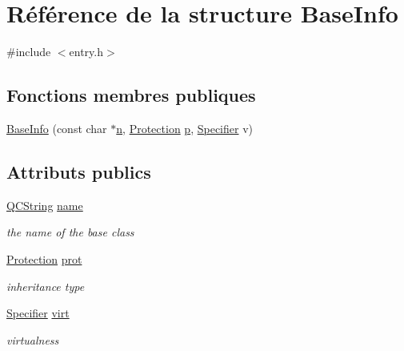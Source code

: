 \hypertarget{struct_base_info}{}\section{Référence de la structure Base\+Info}
\label{struct_base_info}


{\ttfamily \#include $<$entry.\+h$>$}

\subsection*{Fonctions membres publiques}
\begin{DoxyCompactItemize}
\item 
\hyperlink{struct_base_info_a98a84177d9d88a0520f7db57a13d2a4d}{Base\+Info} (const char $\ast$\hyperlink{060__command__switch_8tcl_acdde3cd86eb2421ce8dbb2e85227d368}{n}, \hyperlink{types_8h_a90e352184df58cd09455fe9996cd4ded}{Protection} \hyperlink{060__command__switch_8tcl_a15229b450f26d8fa1c10bea4f3279f4d}{p}, \hyperlink{types_8h_ab16236bdd10ddf4d73a9847350f0017e}{Specifier} v)
\end{DoxyCompactItemize}
\subsection*{Attributs publics}
\begin{DoxyCompactItemize}
\item 
\hyperlink{class_q_c_string}{Q\+C\+String} \hyperlink{struct_base_info_ae8bba327d477830b4664f9d03b05c97b}{name}
\begin{DoxyCompactList}\small\item\em the name of the base class \end{DoxyCompactList}\item 
\hyperlink{types_8h_a90e352184df58cd09455fe9996cd4ded}{Protection} \hyperlink{struct_base_info_aaf46efd63ca2b598a79324042bac83f3}{prot}
\begin{DoxyCompactList}\small\item\em inheritance type \end{DoxyCompactList}\item 
\hyperlink{types_8h_ab16236bdd10ddf4d73a9847350f0017e}{Specifier} \hyperlink{struct_base_info_ab32fa6c3344b6608768043f6ee5a8e6b}{virt}
\begin{DoxyCompactList}\small\item\em virtualness \end{DoxyCompactList}\end{DoxyCompactItemize}


